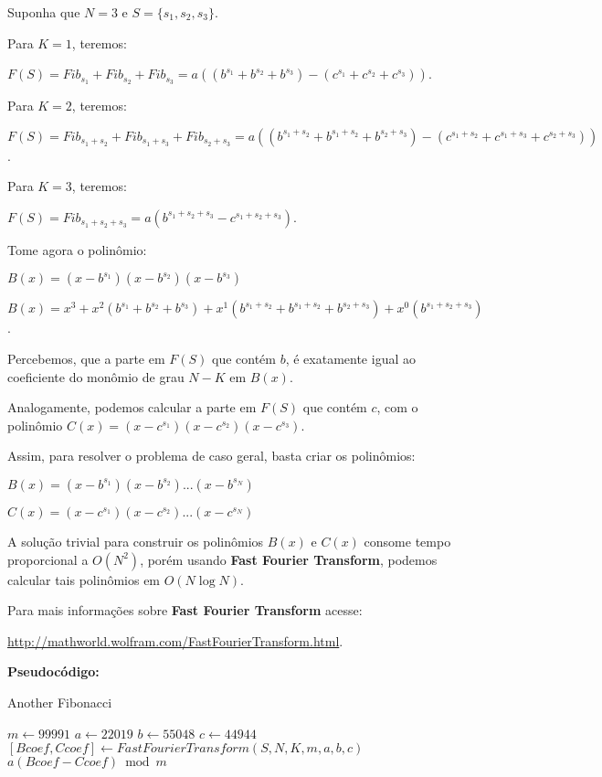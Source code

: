 Suponha que $N=3$ e $S=\{s_1, s_2, s_3\}$. 

Para $K=1$, teremos:

$F(S) = Fib_{s_1}+Fib_{s_2}+Fib_{s_3} = a((b^{s_1}+b^{s_2}+b^{s_3}) - (c^{s_1}+c^{s_2}+c^{s_3}))$.

Para $K=2$, teremos:

$F(S) = Fib_{s_1+s_2}+Fib_{s_1+s_3}+Fib_{s_2+s_3} = a((b^{s_1+s_2}+b^{s_1+s_2}+b^{s_2+s_3}) - (c^{s_1+s_2}+c^{s_1+s_3}+c^{s_2+s_3}))$.

Para $K=3$, teremos:

$F(S) = Fib_{s_1+s_2+s_3} = a(b^{s_1+s_2+s_3} - c^{s_1+s_2+s_3})$.
\newline

Tome agora o polinômio: 

$B(x) = (x-b^{s_1})(x-b^{s_2})(x-b^{s_3})$

$B(x) = x^3 + x^2(b^{s_1}+b^{s_2}+b^{s_3}) + x^1(b^{s_1+s_2}+b^{s_1+s_2}+b^{s_2+s_3}) + x^0(b^{s_1+s_2+s_3})$.

Percebemos, que a parte em $F(S)$ que contém $b$, é exatamente igual ao coeficiente do monômio de grau $N-K$ em $B(x)$.

Analogamente, podemos calcular a parte em $F(S)$ que contém $c$, com o polinômio $C(x) = (x-c^{s_1})(x-c^{s_2})(x-c^{s_3})$.
\newline

Assim, para resolver o problema de caso geral, basta criar os polinômios:

$B(x) = (x-b^{s_1})(x-b^{s_2})...(x-b^{s_N})$

$C(x) = (x-c^{s_1})(x-c^{s_2})...(x-c^{s_N})$
\newline

A solução trivial para construir os polinômios $B(x)$ e $C(x)$ consome tempo proporcional a $O(N^2)$, porém usando 
\textbf{Fast Fourier Transform}, podemos calcular tais polinômios em $O(N\log N)$.
\newline

Para mais informações sobre  \textbf{Fast Fourier Transform} acesse:

\href{http://mathworld.wolfram.com/FastFourierTransform.html}{http://mathworld.wolfram.com/FastFourierTransform.html}.
\newline

\textbf{Pseudocódigo:}
\begin{algorithm}
\caption{Another Fibonacci}
\begin{algorithmic}[1]
\State $m \gets 99991$
\State $a \gets 22019$
\State $b \gets 55048$
\State $c \gets 44944$
\\
\State $[Bcoef, Ccoef]\gets FastFourierTransform(S,N,K,m,a,b,c)$ 
\\
\State \Return $a(Bcoef - Ccoef)\bmod m$

\EndProcedure
\end{algorithmic}
\end{algorithm}


